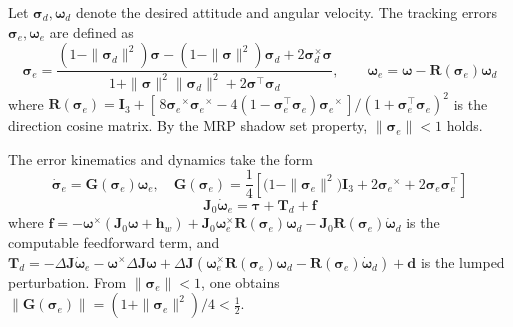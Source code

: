 \documentclass[journal]{new-aiaa}
\begin{document}
Let $\boldsymbol{\sigma}_d,\boldsymbol{\omega}_d$ denote the desired attitude and angular velocity.
The tracking errors $\boldsymbol{\sigma}_e,\boldsymbol{\omega}_e$ are defined as
\begin{equation}
\boldsymbol{\sigma}_e =
\frac{(1-\|\boldsymbol{\sigma}_d\|^2)\boldsymbol{\sigma}-(1-\|\boldsymbol{\sigma}\|^2)\boldsymbol{\sigma}_d
+2\boldsymbol{\sigma}_d^{\times}\boldsymbol{\sigma}}
{1+\|\boldsymbol{\sigma}\|^2\|\boldsymbol{\sigma}_d\|^2+2\boldsymbol{\sigma}^\top\boldsymbol{\sigma}_d},
\qquad
\boldsymbol{\omega}_e = \boldsymbol{\omega} - \boldsymbol{R}(\boldsymbol{\sigma}_e)\boldsymbol{\omega}_d
\label{eq:error_definitions}
\end{equation}
where $\boldsymbol{R}(\boldsymbol{\sigma}_e) = \boldsymbol{I}_3 + [\,8{\boldsymbol{\sigma}_e}^{\times}{\boldsymbol{\sigma}_e}^{\times}
- 4(1-\boldsymbol{\sigma}_e^\top\boldsymbol{\sigma}_e){\boldsymbol{\sigma}_e}^{\times}\,]/(1+\boldsymbol{\sigma}_e^\top\boldsymbol{\sigma}_e)^2$
is the direction cosine matrix. By the MRP shadow set property,
$\|\boldsymbol{\sigma}_e\|<1$ holds.

The error kinematics and dynamics take the form
\begin{equation}
\dot{\boldsymbol{\sigma}}_e = \boldsymbol{G}(\boldsymbol{\sigma}_e)\boldsymbol{\omega}_e , \quad
\boldsymbol{G}(\boldsymbol{\sigma}_e) = \frac{1}{4} \left[ \big(1 - \|\boldsymbol{\sigma}_e\|^2\big) \boldsymbol{I}_3 + 2 {\boldsymbol{\sigma}_e}^{\times} + 2 \boldsymbol{\sigma}_e \boldsymbol{\sigma}_e^\top \right]
\label{eq:mrp_error_kinematics}
\end{equation}
\begin{equation}
\boldsymbol{J}_0 \dot{\boldsymbol{\omega}}_e = \boldsymbol{\tau} + \boldsymbol{T}_d + \boldsymbol{f}
\label{eq:simplified_error_dynamics}
\end{equation}
where
$\boldsymbol{f} = - \boldsymbol{\omega}^{\times} (\boldsymbol{J}_0 \boldsymbol{\omega} + \boldsymbol{h}_w)+
\boldsymbol{J}_0 \boldsymbol{\omega}_e^{\times} \boldsymbol{R}(\boldsymbol{\sigma}_e)\boldsymbol{\omega}_d-
\boldsymbol{J}_0 \boldsymbol{R}(\boldsymbol{\sigma}_e)\dot{\boldsymbol{\omega}}_d$
is the computable feedforward term, and
$\boldsymbol{T}_d = -\Delta \boldsymbol{J} \dot{\boldsymbol{\omega}}_e - \boldsymbol{\omega}^\times \Delta \boldsymbol{J}
\boldsymbol{\omega} + \Delta \boldsymbol{J} (\boldsymbol{\omega}_e^\times \boldsymbol{R}(\boldsymbol{\sigma}_e)
\boldsymbol{\omega}_d - \boldsymbol{R}(\boldsymbol{\sigma}_e) \dot{\boldsymbol{\omega}}_d) + \boldsymbol{d}$
is the lumped perturbation. From $\|\boldsymbol{\sigma}_e\|<1$, one obtains
$\|\boldsymbol{G}(\boldsymbol{\sigma}_e)\| = (1+\|\boldsymbol{\sigma}_e\|^2)/4 < \tfrac{1}{2}$.
\end{document}
